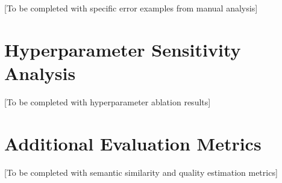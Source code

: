 \documentclass[manuscript, screen, review]{acmart}
\begin{document}
[To be completed with specific error examples from manual analysis]

\section{Hyperparameter Sensitivity Analysis}
\label{app:hyperparams}


[To be completed with hyperparameter ablation results]

\section{Additional Evaluation Metrics}
\label{app:metrics}


[To be completed with semantic similarity and quality estimation metrics]
\end{document}
